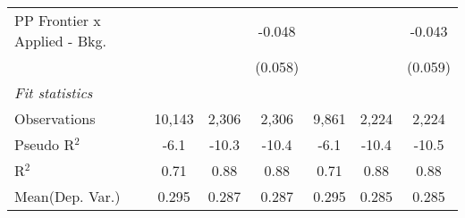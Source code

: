 \begin{tabular}{lcccccc}
   PP Frontier x Applied - Bkg.   &                &              & -0.048         &                &              & -0.043\\   
                                  &                &              & (0.058)        &                &              & (0.059)\\   
   \midrule
   \emph{Fit statistics}\\
   Observations                   & 10,143         & 2,306        & 2,306          & 9,861          & 2,224        & 2,224\\  
   Pseudo R$^2$                   & -6.1           & -10.3        & -10.4          & -6.1           & -10.4        & -10.5\\  
   R$^2$                          & 0.71           & 0.88         & 0.88           & 0.71           & 0.88         & 0.88\\  
Mean(Dep. Var.) & 0.295 & 0.287 & 0.287 & 0.295 & 0.285 & 0.285 \\
   

\end{tabular}
